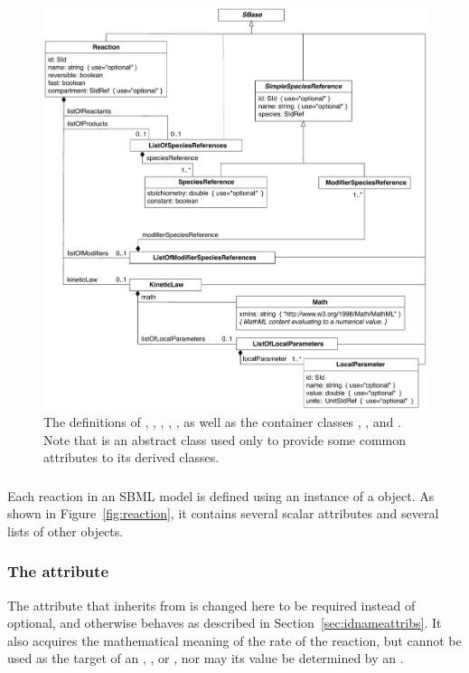 \begin{figure}[b]
  \centering
  \includegraphics[scale=0.78]{figs/reaction-uml-v2}
  \caption{The definitions of \Reaction, \KineticLaw,
    \SpeciesReference, \ModifierSpeciesReference, \LocalParameter,
    as well as the container classes \ListOfSpeciesReferences,
    \ListOfModifierSpeciesReferences, and \ListOfLocalParameters.
    Note that \SimpleSpeciesReferenceUpright is an abstract class used
    only to provide some common attributes to its derived
    classes.}
  \label{fig:reaction}
\end{figure}


\subsubsection{}
\label{sec:reaction-type}
\label{sec:listofreactants}
\label{sec:listofproducts}
\label{sec:listofmodifiers}

Each reaction in an SBML model is defined using an instance of a
\Reaction object.  As shown in Figure~\vref{fig:reaction}, it
contains several scalar attributes and several lists of other
objects.


\begin{blockChanged}
\subsubsection{The  attribute}

The  attribute that \Reaction inherits from \SBase is changed here to be required instead of optional, and otherwise behaves as described in Section~\ref{sec:idnameattribs}.  It also acquires the mathematical meaning of the rate of the reaction, but cannot be used as the target of an \InitialAssignment, \EventAssignment, or \Rule, nor may its value be determined by an \AlgebraicRule.
\end{blockChanged}

